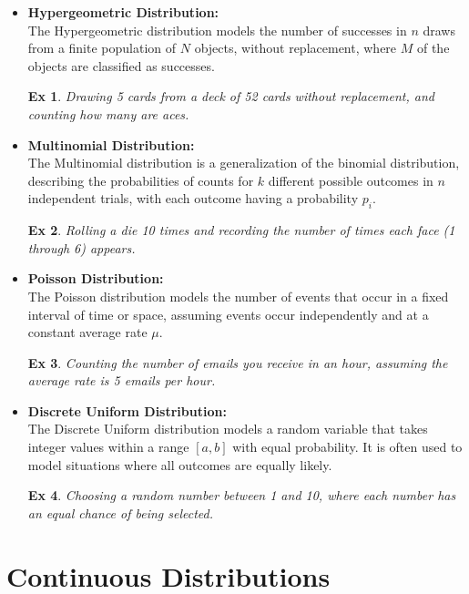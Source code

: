 \documentclass[a4paper,extrafontsizes, 9pt]{memoir}
\newtheorem*{ex}{Ex}
\begin{document}
\begin{multicols}{2}
\begin{itemize}
    \item \textbf{Hypergeometric Distribution:} \\
    The Hypergeometric distribution models the number of successes in $n$ draws from a finite population of $N$ objects, without replacement, where $M$ of the objects are classified as successes.
    \begin{ex}
        Drawing 5 cards from a deck of 52 cards without replacement, and counting how many are aces.
    \end{ex}

    \item \textbf{Multinomial Distribution:} \\
    The Multinomial distribution is a generalization of the binomial distribution, describing the probabilities of counts for $k$ different possible outcomes in $n$ independent trials, with each outcome having a probability $p_i$.
    \begin{ex}
        Rolling a die 10 times and recording the number of times each face (1 through 6) appears.
    \end{ex}

    \item \textbf{Poisson Distribution:} \\
    The Poisson distribution models the number of events that occur in a fixed interval of time or space, assuming events occur independently and at a constant average rate $\mu$.
    \begin{ex}
        Counting the number of emails you receive in an hour, assuming the average rate is 5 emails per hour.
    \end{ex}

    \item \textbf{Discrete Uniform Distribution:} \\
    The Discrete Uniform distribution models a random variable that takes integer values within a range $[a, b]$ with equal probability. It is often used to model situations where all outcomes are equally likely.
    \begin{ex}
        Choosing a random number between 1 and 10, where each number has an equal chance of being selected.
    \end{ex}
\end{itemize}

\section*{Continuous Distributions}


\end{multicols}
\end{document}
